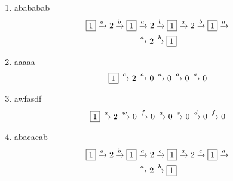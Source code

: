 \documentclass[12pt]{article}
\begin{document}
 
\begin {enumerate} 
\item abababab
\begin {equation*} 
\begin {gathered} 
\fbox{1} \xrightarrow{a} 2 \xrightarrow{b} \fbox{1} \xrightarrow{a} 2 \xrightarrow{b} \fbox{1} \xrightarrow{a} 2 \xrightarrow{b} \fbox{1} \xrightarrow{a} \\
 \xrightarrow{a} 2 \xrightarrow{b} \fbox{1}
\end {gathered} 
\end {equation*} 
\item aaaaa
\begin {equation*} 
\begin {gathered} 
\fbox{1} \xrightarrow{a} 2 \xrightarrow{a} 0 \xrightarrow{a} 0 \xrightarrow{a} 0 \xrightarrow{a} 0
\end {gathered} 
\end {equation*} 
\item awfasdf
\begin {equation*} 
\begin {gathered} 
\fbox{1} \xrightarrow{a} 2 \xrightarrow{w} 0 \xrightarrow{f} 0 \xrightarrow{a} 0 \xrightarrow{s} 0 \xrightarrow{d} 0 \xrightarrow{f} 0
\end {gathered} 
\end {equation*} 
\item abacacab
\begin {equation*} 
\begin {gathered} 
\fbox{1} \xrightarrow{a} 2 \xrightarrow{b} \fbox{1} \xrightarrow{a} 2 \xrightarrow{c} \fbox{1} \xrightarrow{a} 2 \xrightarrow{c} \fbox{1} \xrightarrow{a} \\
 \xrightarrow{a} 2 \xrightarrow{b} \fbox{1}
\end {gathered} 
\end {equation*} 
\end {enumerate}
\end{document}
